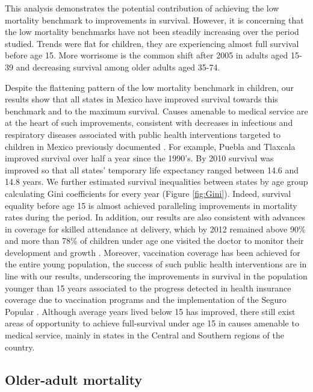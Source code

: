 \documentclass[11.5pt]{article}
\begin{document}
\begin{spacing}{1.5}
This analysis demonstrates the potential contribution of achieving the low mortality benchmark to improvements in survival. However, it is concerning that the low mortality benchmarks have not been steadily increasing over the period studied. Trends were flat for children, they are experiencing almost full survival before age 15. More worrisome is the common shift after 2005 in adults aged 15-39 and decreasing survival among older adults aged 35-74.

Despite the flattening pattern of the low mortality benchmark in children, our results show that all states in Mexico have improved survival towards this benchmark and to the maximum survival. Causes amenable to medical service are at the heart of such improvements, consistent with decreases in infectious and respiratory diseases associated with public health interventions targeted to children in Mexico previously documented \citep{sepulveda2006}. For example, Puebla and Tlaxcala improved survival over half a year since the 1990's. By 2010 survival was improved so that all states' temporary life expectancy ranged between 14.6 and 14.8 years. We further estimated survival inequalities between states by age group calculating Gini coefficients for every year (Figure \ref{fig:Gini}).  Indeed, survival equality before age 15 is almost achieved paralleling improvements in mortality rates during the period. In addition, our results are also consistent with advances in coverage for skilled attendance at delivery, which by 2012 remained above 90\% and more than 78\% of children under age one visited the doctor to monitor their development and growth  \citep{urquieta2015evolution}. Moreover, vaccination coverage has been achieved for the entire young population, the success of such public health interventions are in line with our results, underscoring the improvements in survival in the population younger than 15 years associated to the progress detected in health insurance coverage due to vaccination programs and the implementation of the Seguro Popular \citep{urquieta2015evolution}. Although average years lived below 15 has improved, there still exist areas of opportunity to achieve full-survival under age 15 in causes amenable to medical service, mainly in states in the Central and Southern regions of the country. 


\subsection*{Older-adult mortality}


\end{spacing}
\end{document}
